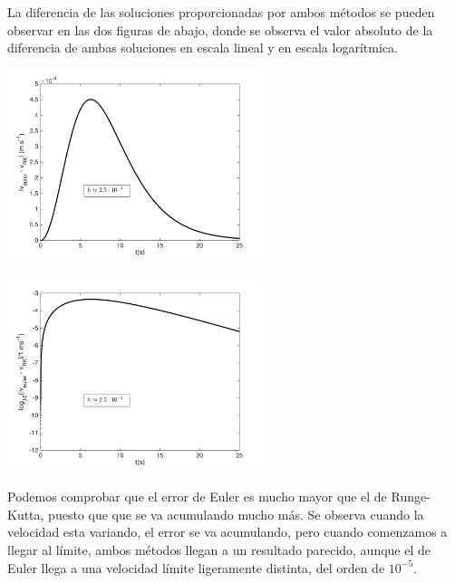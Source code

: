 \documentclass{article}
\begin{document}
La diferencia de las soluciones proporcionadas por ambos métodos se pueden observar en las dos figuras de abajo, donde se observa el valor absoluto de la diferencia de ambas soluciones en escala lineal y en escala logarítmica.

  \begin{minipage}{8cm}
	\centering
	\includegraphics[width=7.5cm]{untitled.png}
  \end{minipage}%
  \begin{minipage}{8cm}
	\centering
	\includegraphics[width=7.5cm]{untitled1.png}
  \end{minipage}

Podemos comprobar que el error de Euler es mucho mayor que el de Runge-Kutta, puesto que que se va acumulando mucho más. Se observa cuando la velocidad esta variando, el error se va acumulando, pero cuando comenzamos a llegar al límite, ambos métodos llegan a un resultado parecido, aunque el de Euler llega a una velocidad límite ligeramente distinta, del orden de $10^{-5}$.
\end{document}

